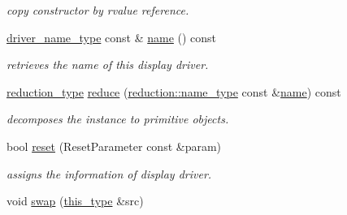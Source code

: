 \begin{DoxyCompactItemize}
\begin{DoxyCompactList}\small\item\em copy constructor by rvalue reference. \end{DoxyCompactList}\item 
\hypertarget{classhryky_1_1display_1_1_driver_ad2ef4e4181112346aa57e4cc5fada687}{\hyperlink{namespacehryky_1_1display_a393bfca9f51ab987a1e795c8502c4db4}{driver\-\_\-name\-\_\-type} const \& \hyperlink{classhryky_1_1display_1_1_driver_ad2ef4e4181112346aa57e4cc5fada687}{name} () const }\label{classhryky_1_1display_1_1_driver_ad2ef4e4181112346aa57e4cc5fada687}

\begin{DoxyCompactList}\small\item\em retrieves the name of this display driver. \end{DoxyCompactList}\item 
\hypertarget{classhryky_1_1display_1_1_driver_aa0552ff74dc98f736326923475ae0625}{\hyperlink{namespacehryky_a343a9a4c36a586be5c2693156200eadc}{reduction\-\_\-type} \hyperlink{classhryky_1_1display_1_1_driver_aa0552ff74dc98f736326923475ae0625}{reduce} (\hyperlink{namespacehryky_1_1reduction_ac686c30a4c8d196bbd0f05629a6b921f}{reduction\-::name\-\_\-type} const \&\hyperlink{classhryky_1_1display_1_1_driver_ad2ef4e4181112346aa57e4cc5fada687}{name}) const }\label{classhryky_1_1display_1_1_driver_aa0552ff74dc98f736326923475ae0625}

\begin{DoxyCompactList}\small\item\em decomposes the instance to primitive objects. \end{DoxyCompactList}\item 
\hypertarget{classhryky_1_1display_1_1_driver_aec590bd4090493a5fb6d9a9c4a0dfe83}{bool \hyperlink{classhryky_1_1display_1_1_driver_aec590bd4090493a5fb6d9a9c4a0dfe83}{reset} (Reset\-Parameter const \&param)}\label{classhryky_1_1display_1_1_driver_aec590bd4090493a5fb6d9a9c4a0dfe83}

\begin{DoxyCompactList}\small\item\em assigns the information of display driver. \end{DoxyCompactList}\item 
\hypertarget{classhryky_1_1display_1_1_driver_a7e5660ca2ff8fe969e22465ed39a9541}{void \hyperlink{classhryky_1_1display_1_1_driver_a7e5660ca2ff8fe969e22465ed39a9541}{swap} (\hyperlink{classhryky_1_1display_1_1_driver_aeed838549fff082eceb3504a3b701fb5}{this\-\_\-type} \&src)}\label{classhryky_1_1display_1_1_driver_a7e5660ca2ff8fe969e22465ed39a9541}


\end{DoxyCompactItemize}
